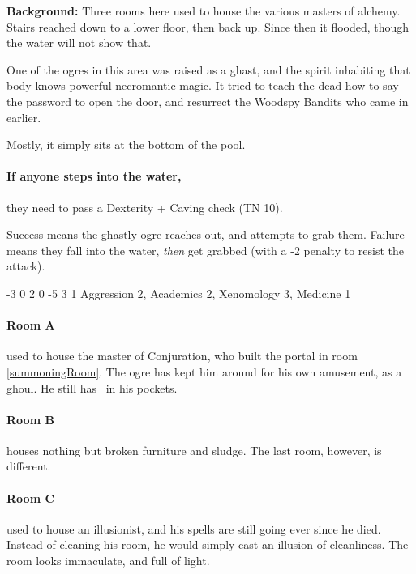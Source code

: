 \begin{multicols}{2}
\begin{boxtext}
\end{boxtext}

\textbf{Background:}
Three rooms here used to house the various masters of alchemy.
Stairs reached down to a lower floor, then back up.
Since then it flooded, though the water will not show that.

One of the ogres in this area was raised as a ghast, and the spirit inhabiting that body knows powerful necromantic magic.
It tried to teach the dead how to say the password to open the door, and resurrect the Woodspy Bandits who came in earlier.

Mostly, it simply sits at the bottom of the pool.

\paragraph{If anyone steps into the water,}
they need to pass a Dexterity + Caving check (TN 10).

Success means the ghastly ogre reaches out, and attempts to grab them.
Failure means they fall into the water, \emph{then} get grabbed (with a -2 penalty to resist the attack).

\label{undead_ogre}

  {-3}%
  {0}%
  {{2}%
  {0}%
  {-5}}%
  {3}%
  {1}%
  {
    Aggression 2, Academics 2, Xenomology 3, Medicine 1
  }%
  {\longsword}%
  {
    \addtocounter{xpbonus}{3}
    \setcounter{Fate}{2}
    \setcounter{Air}{2}
    \setcounter{Water}{1}
  }

\paragraph{Room A} used to house the master of Conjuration, who built the portal in room \ref{summoningRoom}.
The ogre has kept him around for his own amusement, as a ghoul.
He still has \lootBig\ in his pockets.

\paragraph{Room B} houses nothing but broken furniture and sludge.
The last room, however, is different.

\paragraph{Room C} used to house an illusionist, and his spells are still going ever since he died.
Instead of cleaning his room, he would simply cast an illusion of cleanliness.
The room looks immaculate, and full of light.


\end{multicols}

